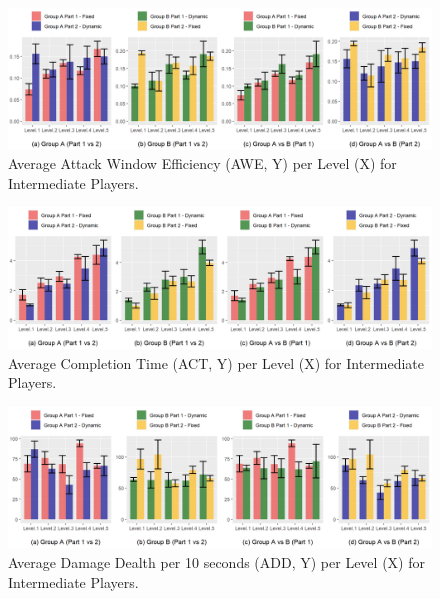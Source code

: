 \begin{figure}[!ht]
    \caption{Average Attack Window Efficiency (AWE, Y) per Level (X) for Intermediate Players.}
    \begin{center}
        \includegraphics[width=34em]{figures/attack_window_efficiency-intermediate_players.png}
    \end{center}
    \label{fig:result-metric-intermediates-attack-window-efficiency}
\end{figure}

\begin{figure}[!ht]
    \caption{Average Completion Time (ACT, Y) per Level (X) for Intermediate Players.}
    \begin{center}
        \includegraphics[width=34em]{figures/completion_time-intermediate_players.png}
    \end{center}
    \label{fig:result-metric-intermediates-completion-time}
\end{figure}

\begin{figure}[!ht]
    \caption{Average Damage Dealth per 10 seconds (ADD, Y) per Level (X) for Intermediate Players.}
    \begin{center}
        \includegraphics[width=34em]{figures/damage_dealt_per_10s-intermediate_players.png}
    \end{center}
    \label{fig:result-metric-intermediates-damage-dealt-per-10s}
\end{figure}

